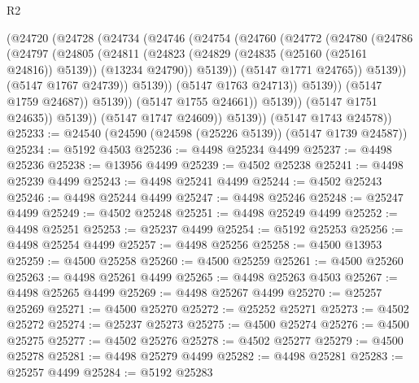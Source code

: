 \begin{lexlean}{R2}
\begin{coremodule}
                            (@24720
                              (@24728
                                (@24734
                                  (@24746
                                    (@24754
                                      (@24760
                                        (@24772
                                          (@24780
                                            (@24786
                                              (@24797
                                                (@24805
                                                  (@24811
                                                    (@24823
                                                      (@24829
                                                        (@24835 (@25160 (@25161 @24816)) @5139))
                                                      (@13234 @24790))
                                                    @5139))
                                                (@5147 @1771 @24765))
                                              @5139))
                                          (@5147 @1767 @24739))
                                        @5139))
                                    (@5147 @1763 @24713))
                                  @5139))
                              (@5147 @1759 @24687))
                            @5139))
                        (@5147 @1755 @24661))
                      @5139))
                  (@5147 @1751 @24635))
                @5139))
            (@5147 @1747 @24609))
          @5139))
      (@5147 @1743 @24578))
@25233 := @24540 (@24590 (@24598 (@25226 @5139)) (@5147 @1739 @24587))
@25234 := @5192 @4503
@25236 := @4498 @25234 @4499
@25237 := @4498 @25236
@25238 := @13956 @4499
@25239 := @4502 @25238
@25241 := @4498 @25239 @4499
@25243 := @4498 @25241 @4499
@25244 := @4502 @25243
@25246 := @4498 @25244 @4499
@25247 := @4498 @25246
@25248 := @25247 @4499
@25249 := @4502 @25248
@25251 := @4498 @25249 @4499
@25252 := @4498 @25251
@25253 := @25237 @4499
@25254 := @5192 @25253
@25256 := @4498 @25254 @4499
@25257 := @4498 @25256
@25258 := @4500 @13953
@25259 := @4500 @25258
@25260 := @4500 @25259
@25261 := @4500 @25260
@25263 := @4498 @25261 @4499
@25265 := @4498 @25263 @4503
@25267 := @4498 @25265 @4499
@25269 := @4498 @25267 @4499
@25270 := @25257 @25269
@25271 := @4500 @25270
@25272 := @25252 @25271
@25273 := @4502 @25272
@25274 := @25237 @25273
@25275 := @4500 @25274
@25276 := @4500 @25275
@25277 := @4502 @25276
@25278 := @4502 @25277
@25279 := @4500 @25278
@25281 := @4498 @25279 @4499
@25282 := @4498 @25281
@25283 := @25257 @4499
@25284 := @5192 @25283

\end{coremodule}
\end{lexlean}
